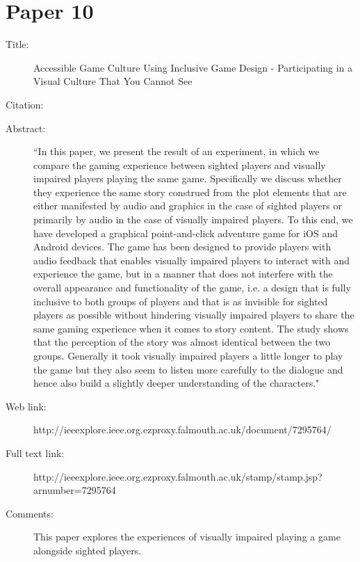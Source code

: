\documentclass{scrartcl}
\begin{document}
\section*{Paper 10}
\begin{description}
\item[Title:] Accessible Game Culture Using Inclusive Game Design - Participating in a Visual Culture That You Cannot See
\item[Citation:] \cite{Wihelmsson} 
\item[Abstract:] ``In this paper, we present the result of an experiment, in which we compare the gaming experience between sighted players and visually impaired players playing the same game. Specifically we discuss whether they experience the same story construed from the plot elements that are either manifested by audio and graphics in the case of sighted players or primarily by audio in the case of visually impaired players. To this end, we have developed a graphical point-and-click adventure game for iOS and Android devices. The game has been designed to provide players with audio feedback that enables visually impaired players to interact with and experience the game, but in a manner that does not interfere with the overall appearance and functionality of the game, i.e. a design that is fully inclusive to both groups of players and that is as invisible for sighted players as possible without hindering visually impaired players to share the same gaming experience when it comes to story content. The study shows that the perception of the story was almost identical between the two groups. Generally it took visually impaired players a little longer to play the game but they also seem to listen more carefully to the dialogue and hence also build a slightly deeper understanding of the characters."
\item[Web link:] http://ieeexplore.ieee.org.ezproxy.falmouth.ac.uk/document/7295764/
\item[Full text link:] http://ieeexplore.ieee.org.ezproxy.falmouth.ac.uk/stamp/stamp.jsp?arnumber=7295764
\item[Comments:] This paper explores the experiences of visually impaired playing a game alongside sighted players.
\end{description}
\end{document}
